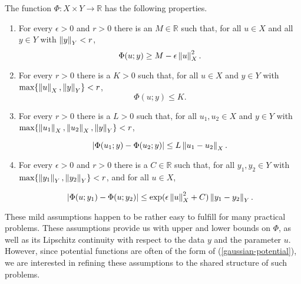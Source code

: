 \begin{assumption} \label{assumption-ll}
  The function $\Phi : X \times Y \rightarrow \mathbb{R}$ has the following properties.
  
  \begin{enumerate}
  \item For every $\epsilon > 0$ and $r > 0$ there is an $M \in \mathbb{R}$ such that, for all $u \in X$ and all $y \in Y$ with $\left\lVert y\right\rVert_Y < r$,
    \begin{equation*}
      \Phi(u; y) \ge M - \epsilon\left\lVert u\right\rVert_X^2.
    \end{equation*}
  \item For every $r > 0$ there is a $K > 0$ such that, for all $u \in X$ and $y \in Y$ with $\text{max}\{\left\lVert u\right\rVert_X, \left\lVert y\right\rVert_Y\} < r$,
    \begin{equation*}
      \Phi(u; y) \le K.
    \end{equation*}

  \item For every $r > 0$ there is a $L > 0$ such that, for all $u_1, u_2 \in X$ and $y \in Y$ with $\text{max}\{\left\lVert u_1\right\rVert_X, \left\lVert u_2\right\rVert_X, \left\lVert y\right\rVert_Y\} < r$,

    \begin{equation*}
      |\Phi(u_1; y) - \Phi(u_2; y)| \le L\left\lVert u_1 - u_2\right\rVert_X.
    \end{equation*}

  \item For every $\epsilon > 0$ and $r > 0$ there is a $C \in \mathbb{R}$ such that, for all $y_1, y_2 \in Y$ with $\text{max}\{\left\lVert y_1\right\rVert_Y, \left\lVert y_2\right\rVert_Y\} < r$, and for all $u \in X$,

    \begin{equation*}
      |\Phi(u; y_1) - \Phi(u; y_2)| \le \exp(\epsilon\left\lVert u\right\rVert_X^2 + C)\left\lVert y_1 - y_2\right\rVert_Y.
    \end{equation*}
  \end{enumerate}
\end{assumption}

These mild assumptions happen to be rather easy to fulfill for many practical problems. These assumptions provide us with upper and lower bounds on $\Phi$, as well as its Lipschitz continuity with respect to the data $y$ and the parameter $u$.  However, since potential functions are often of the form of (\ref{gaussian-potential}), we are interested in refining these assumptions to the shared structure of such problems.

